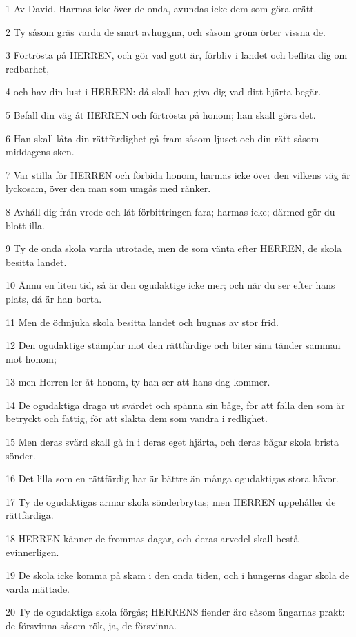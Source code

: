 \par 1 Av David. Harmas icke över de onda, avundas icke dem som göra orätt.
\par 2 Ty såsom gräs varda de snart avhuggna, och såsom gröna örter vissna de.
\par 3 Förtrösta på HERREN, och gör vad gott är, förbliv i landet och beflita dig om redbarhet,
\par 4 och hav din lust i HERREN: då skall han giva dig vad ditt hjärta begär.
\par 5 Befall din väg åt HERREN och förtrösta på honom; han skall göra det.
\par 6 Han skall låta din rättfärdighet gå fram såsom ljuset och din rätt såsom middagens sken.
\par 7 Var stilla för HERREN och förbida honom, harmas icke över den vilkens väg är lyckosam, över den man som umgås med ränker.
\par 8 Avhåll dig från vrede och låt förbittringen fara; harmas icke; därmed gör du blott illa.
\par 9 Ty de onda skola varda utrotade, men de som vänta efter HERREN, de skola besitta landet.
\par 10 Ännu en liten tid, så är den ogudaktige icke mer; och när du ser efter hans plats, då är han borta.
\par 11 Men de ödmjuka skola besitta landet och hugnas av stor frid.
\par 12 Den ogudaktige stämplar mot den rättfärdige och biter sina tänder samman mot honom;
\par 13 men Herren ler åt honom, ty han ser att hans dag kommer.
\par 14 De ogudaktiga draga ut svärdet och spänna sin båge, för att fälla den som är betryckt och fattig, för att slakta dem som vandra i redlighet.
\par 15 Men deras svärd skall gå in i deras eget hjärta, och deras bågar skola brista sönder.
\par 16 Det lilla som en rättfärdig har är bättre än många ogudaktigas stora håvor.
\par 17 Ty de ogudaktigas armar skola sönderbrytas; men HERREN uppehåller de rättfärdiga.
\par 18 HERREN känner de frommas dagar, och deras arvedel skall bestå evinnerligen.
\par 19 De skola icke komma på skam i den onda tiden, och i hungerns dagar skola de varda mättade.
\par 20 Ty de ogudaktiga skola förgås; HERRENS fiender äro såsom ängarnas prakt: de försvinna såsom rök, ja, de försvinna.
